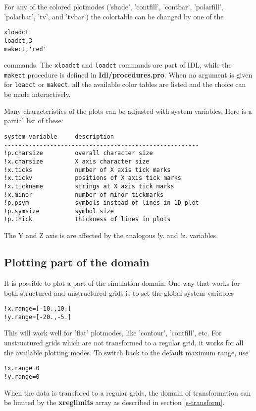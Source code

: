    For any of the colored plotmodes ('shade', 'contfill', 'contbar', 
   'polarfill', 'polarbar', 'tv', and 'tvbar') the colortable can be 
   changed by one of the 
\begin{verbatim}
xloadct
loadct,3
makect,'red'
\end{verbatim}
   commands. The {\tt xloadct} and {\tt loadct} commands are part of IDL, while
   the {\tt makect} procedure is defined in {\bf Idl/procedures.pro}.
   When no argument is given for {\tt loadct} or {\tt makect}, 
   all the available color tables are listed
   and the choice can be made interactively.

   Many characteristics of the plots can be adjusted with system variables.
   Here is a partial list of these:
\begin{verbatim}
system variable     description
-------------------------------------------------------
!p.charsize         overall character size
!x.charsize         X axis character size
!x.ticks            number of X axis tick marks
!x.tickv            positions of X axis tick marks
!x.tickname         strings at X axis tick marks
!x.minor            number of minor tickmarks
!p.psym             symbols instead of lines in 1D plot
!p.symsize          symbol size
!p.thick            thickness of lines in plots
\end{verbatim}
  The Y and Z axis is are affected by the analogous !y. and !z. variables.

\subsection{Plotting part of the domain \label{s-plot-part}}

   It is possible to plot a part of the simulation domain.
   One way that works for both structured and unstructured grids is
   to set the global system variables
\begin{verbatim}
!x.range=[-10.,10.]
!y.range=[-20.,-5.]
\end{verbatim}
   This will work well for 'flat' plotmodes, like 'contour',
   'contfill', etc. For unstructured grids which are not transformed
   to a regular grid, it works for all the available plotting modes.
   To switch back to the default maximum range, use
\begin{verbatim}
!x.range=0
!y.range=0
\end{verbatim}
   When the data is transfored to a regular grids, the domain of transformation
   can be limited by the {\bf xreglimits} array as described in section
   \ref{s-transform}. 

